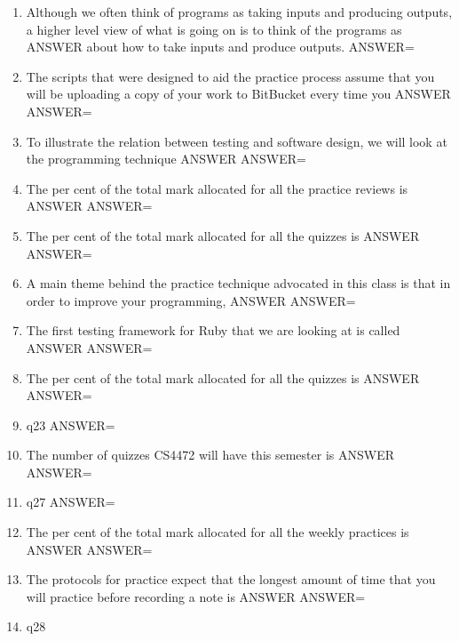 \documentclass{exam}
\begin{document}
\begin{enumerate}
\item Although we often think of programs as taking inputs and producing outputs, a higher level view of what is going on is to think of the programs as ANSWER about how to take inputs and produce outputs.\newline
ANSWER=
\item The scripts that were designed to aid the practice process assume that you will be uploading a copy of your work to BitBucket every time you ANSWER\newline
ANSWER=
\item To illustrate the relation between testing and software design, we will look at the programming technique ANSWER\newline
ANSWER=
\item The per cent of the total mark allocated for all the practice reviews is ANSWER\newline
ANSWER=
\item The per cent of the total mark allocated for all the quizzes is ANSWER\newline
ANSWER=
\item A main theme behind the practice technique advocated in this class is that in order to improve your programming, ANSWER\newline
ANSWER=
\item The first testing framework for Ruby that we are looking at is called ANSWER\newline
ANSWER=
\item The per cent of the total mark allocated for all the quizzes is ANSWER\newline
ANSWER=
\item q23\newline
ANSWER=
\item The number of quizzes CS4472 will have this semester is ANSWER\newline
ANSWER=
\item q27\newline
ANSWER=
\item The per cent of the total mark allocated for all the weekly practices is ANSWER\newline
ANSWER=
\item The protocols for practice expect that the longest amount of time that you will practice before recording a note is ANSWER\newline
ANSWER=
\item q28\newline

\end{enumerate}
\end{document}
